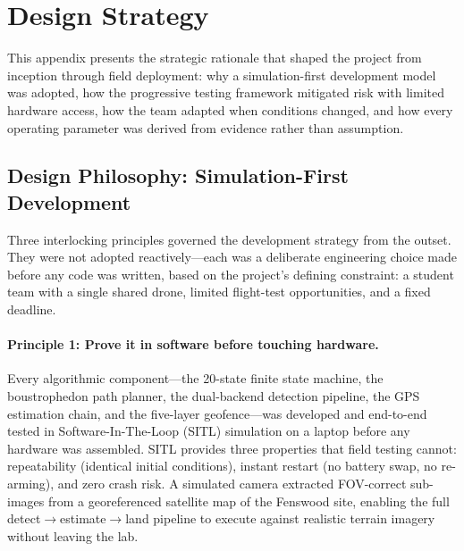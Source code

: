%

\section{Design Strategy}\label{sec:design-strategy}

This appendix presents the strategic rationale that shaped the project from inception through field deployment: why a simulation-first development model was adopted, how the progressive testing framework mitigated risk with limited hardware access, how the team adapted when conditions changed, and how every operating parameter was derived from evidence rather than assumption.

\subsection{Design Philosophy: Simulation-First Development}\label{sec:sim-first-philosophy}

Three interlocking principles governed the development strategy from the outset.
They were not adopted reactively---each was a deliberate engineering choice made before any code was written, based on the project's defining constraint: a student team with a single shared drone, limited flight-test opportunities, and a fixed deadline.

\paragraph{Principle 1: Prove it in software before touching hardware.}
Every algorithmic component---the 20-state finite state machine, the boustrophedon path planner, the dual-backend detection pipeline, the GPS estimation chain, and the five-layer geofence---was developed and end-to-end tested in Software-In-The-Loop (SITL) simulation on a laptop before any hardware was assembled.
SITL provides three properties that field testing cannot: repeatability (identical initial conditions), instant restart (no battery swap, no re-arming), and zero crash risk.
A simulated camera extracted FOV-correct sub-images from a georeferenced satellite map of the Fenswood site, enabling the full detect$\to$estimate$\to$land pipeline to execute against realistic terrain imagery without leaving the lab.

